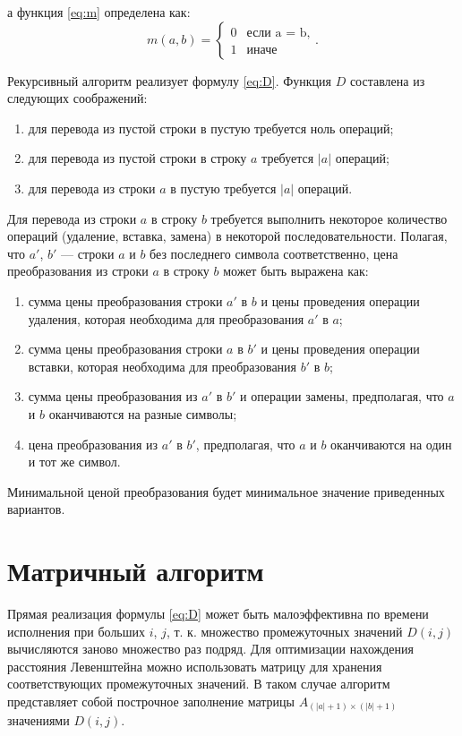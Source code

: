 \documentclass[a4paper,14pt, unknownkeysallowed]{extreport}
\begin{document}
а функция \ref{eq:m} определена как:
\begin{equation}
	\label{eq:m}
	m(a, b) = \begin{cases}
		0 &\text{если a = b,}\\
		1 &\text{иначе}
	\end{cases}.
\end{equation}

Рекурсивный алгоритм реализует формулу \ref{eq:D}.
Функция $D$ составлена из следующих соображений:
\begin{enumerate}
	\item для перевода из пустой строки в пустую требуется ноль операций;
	\item для перевода из пустой строки в строку $a$ требуется $|a|$ операций;
	\item для перевода из строки $a$ в пустую требуется $|a|$ операций.
\end{enumerate}
Для перевода из строки $a$ в строку $b$ требуется выполнить некоторое количество операций (удаление, вставка, замена) в некоторой последовательности. Полагая, что $a'$, $b'$  — строки $a$ и $b$ без последнего символа соответственно, цена преобразования из строки $a$ в строку $b$ может быть выражена как:
	\begin{enumerate}
		\item сумма цены преобразования строки $a'$ в $b$ и цены проведения операции удаления, которая необходима для преобразования $a'$ в $a$;
		\item сумма цены преобразования строки $a$ в $b'$  и цены проведения операции вставки, которая необходима для преобразования $b'$ в $b$;
		\item сумма цены преобразования из $a'$ в $b'$ и операции замены, предполагая, что $a$ и $b$ оканчиваются на разные символы;
		\item цена преобразования из $a'$ в $b'$, предполагая, что $a$ и $b$ оканчиваются на один и тот же символ.
	\end{enumerate}
Минимальной ценой преобразования будет минимальное значение приведенных вариантов.

\section{Матричный алгоритм}

Прямая реализация формулы \ref{eq:D} может быть малоэффективна по времени исполнения при больших $i$, $j$, т. к. множество промежуточных значений $D(i, j)$ вычисляются заново множество раз подряд. Для оптимизации нахождения расстояния Левенштейна можно использовать матрицу для хранения соответствующих промежуточных значений. В таком случае алгоритм представляет собой построчное заполнение матрицы 
$A_{(|a| + 1)\times (|b| + 1)}$ значениями $D(i, j)$.
\end{document}
